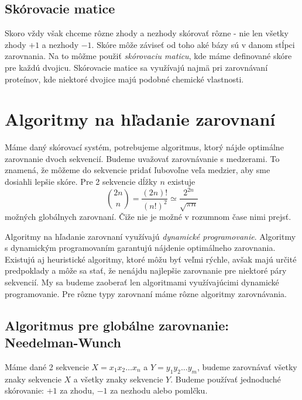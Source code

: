 \subsection{Skórovacie matice}
Skoro vždy však chceme rôzne zhody a nezhody skórovať rôzne - nie len všetky zhody $+1$ a nezhody $-1$.
Skóre môže záviseť od toho aké bázy sú v danom stĺpci zarovnania. Na to môžme použiť \textit{skórovaciu maticu}, kde máme definované skóre pre každú dvojicu. Skórovacie matice sa využívajú najmä pri zarovnávaní proteínov, kde niektoré dvojice majú podobné chemické vlastnosti.
\cite{durbin, skripta}

\section[Algoritmy]{Algoritmy na hľadanie zarovnaní}
Máme daný skórovací systém, potrebujeme algoritmus, ktorý nájde optimálne zarovnanie dvoch sekvencií.
Budeme uvažovať zarovnávanie s medzerami. To znamená, že môžeme do sekvencie pridať ľubovoľne veľa medzier, aby sme dosiahli lepšie skóre. Pre 2 sekvencie dĺžky $n$ existuje
$$ {2n \choose n}  = \frac{(2n)!}{(n!)^2} \simeq \frac{2^{2n}}{\sqrt{\pi n}} $$
možných globálnych zarovnaní. Čiže nie je možné v rozumnom čase nimi prejsť.

Algoritmy na hľadanie zarovnaní využívajú \textit{dynamické programovanie}. Algoritmy s dynamickým programovaním garantujú nájdenie optimálneho zarovnania.
Existujú aj heuristické algoritmy, ktoré môžu byť veľmi rýchle, avšak majú určité predpoklady a môže sa stať, že nenájdu najlepšie zarovnanie pre niektoré páry sekvencií.
My sa budeme zaoberať len algoritmami využívajúcimi dynamické programovanie. Pre rôzne typy zarovnaní máme rôzne algoritmy zarovnávania.
\cite{durbin, skripta}

\subsection{Algoritmus pre globálne zarovnanie: Needelman-Wunch}
\label{subsec:global-alignment}
Máme dané 2 sekvencie $X = x_1x_2\dots x_n$ a $Y = y_1y_2\dots y_m$, budeme zarovnávať všetky znaky sekvencie $X$ a všetky znaky sekvencie $Y$. Budeme používať jednoduché skórovanie: $+1$ za zhodu, $-1$ za nezhodu alebo pomlčku.



